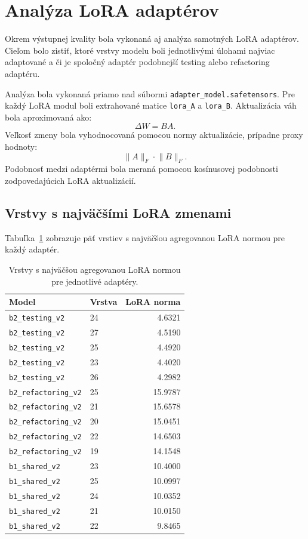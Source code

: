 \documentclass[11pt,a4paper]{article}
\newcommand{\modeltest}{\texttt{b2\_testing\_v2}}
\newcommand{\modelref}{\texttt{b2\_refactoring\_v2}}
\newcommand{\modelshared}{\texttt{b1\_shared\_v2}}
\begin{document}
\section{Analýza LoRA adaptérov}

Okrem výstupnej kvality bola vykonaná aj analýza samotných LoRA adaptérov. Cieľom bolo zistiť, ktoré vrstvy modelu boli jednotlivými úlohami najviac adaptované a či je spoločný adaptér podobnejší testing alebo refactoring adaptéru.

Analýza bola vykonaná priamo nad súbormi \texttt{adapter\_model.safetensors}. Pre každý LoRA modul boli extrahované matice \texttt{lora\_A} a \texttt{lora\_B}. Aktualizácia váh bola aproximovaná ako:
\begin{equation}
\Delta W = BA.
\end{equation}
Veľkosť zmeny bola vyhodnocovaná pomocou normy aktualizácie, prípadne proxy hodnoty:
\begin{equation}
\lVert A \rVert_F \cdot \lVert B \rVert_F.
\end{equation}
Podobnosť medzi adaptérmi bola meraná pomocou kosínusovej podobnosti zodpovedajúcich LoRA aktualizácií.

\subsection{Vrstvy s najväčšími LoRA zmenami}

Tabuľka~\ref{tab:lora-top-layers} zobrazuje päť vrstiev s najväčšou agregovanou LoRA normou pre každý adaptér.

\begin{table}[h]
\centering
\small
\begin{tabular}{llr}
\toprule
Model & Vrstva & LoRA norma \\
\midrule
\modeltest & 24 & 4.6321 \\
\modeltest & 27 & 4.5190 \\
\modeltest & 25 & 4.4920 \\
\modeltest & 23 & 4.4020 \\
\modeltest & 26 & 4.2982 \\
\midrule
\modelref & 25 & 15.9787 \\
\modelref & 21 & 15.6578 \\
\modelref & 20 & 15.0451 \\
\modelref & 22 & 14.6503 \\
\modelref & 19 & 14.1548 \\
\midrule
\modelshared & 23 & 10.4000 \\
\modelshared & 25 & 10.0997 \\
\modelshared & 24 & 10.0352 \\
\modelshared & 21 & 10.0150 \\
\modelshared & 22 & 9.8465 \\
\bottomrule
\end{tabular}
\caption{Vrstvy s najväčšou agregovanou LoRA normou pre jednotlivé adaptéry.}
\label{tab:lora-top-layers}
\end{table}
\end{document}
